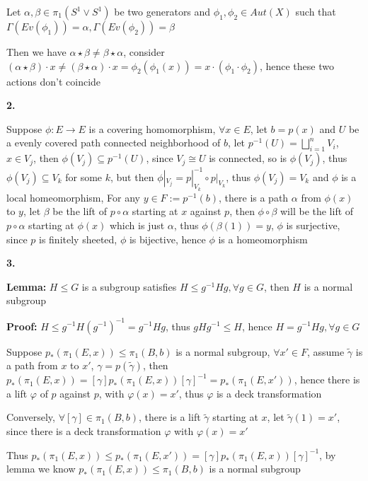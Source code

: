 \documentclass[../main.tex]{subfiles}
\begin{document}
Let $\alpha,\beta\in\pi_1(S^1\vee S^1)$ be two generators and $\phi_1,\phi_2\in Aut(X)$ such that $\Gamma(Ev(\phi_1))=\alpha, \Gamma(Ev(\phi_2))=\beta$ \par
Then we have $\alpha\star\beta\neq\beta\star\alpha$, consider $(\alpha\star\beta)\cdot x\neq (\beta\star\alpha)\cdot x=\phi_2(\phi_1(x))=x\cdot(\phi_1\cdot\phi_2)$, hence these two actions don't coincide \par
\textbf{2.} \par
Suppose $\phi: E\rightarrow E$ is a covering homomorphism, $\forall x\in E$, let $b=p(x)$ and $U$ be a evenly covered path connected neighborhood of $b$, let $p^{-1}(U)=\displaystyle\bigsqcup_{i=1}^nV_i$, $x\in V_j$, then $\phi(V_j)\subseteq p^{-1}(U)$, since $V_j\cong U$ is connected, so is $\phi(V_j)$, thus $\phi(V_j)\subseteq V_k$ for some $k$, but then $\phi|_{V_j}=p|_{V_k}^{-1}\circ p|_{V_k}$, thus $\phi(V_j)=V_k$ and $\phi$ is a local homeomorphism, For any $y\in F:=p^{-1}({b})$, there is a path $\alpha$ from $\phi(x)$ to $y$, let $\beta$ be the lift of $p\circ\alpha$ starting at $x$ against $p$, then $\phi\circ\beta$ will be the lift of $p\circ\alpha$ starting at $\phi(x)$ which is just $\alpha$, thus $\phi(\beta(1))=y$, $\phi$ is surjective, since $p$ is finitely sheeted, $\phi$ is bijective, hence $\phi$ is a homeomorphism \par
\textbf{3.} \par
\textbf{Lemma:} $H\leq G$ is a subgroup satisfies $H\leq g^{-1}Hg, \forall g\in G$, then $H$ is a normal subgroup \par
\textbf{Proof:} $H\leq g^{-1}H(g^{-1})^{-1}=g^{-1}Hg$, thus $gHg^{-1}\leq H$, hence $H=g^{-1}Hg, \forall g\in G$ \par
Suppose $p_*(\pi_1(E,x))\leq\pi_1(B,b)$ is a normal subgroup, $\forall x'\in F$, assume $\widetilde{\gamma}$ is a path from $x$ to $x'$, $\gamma=p(\widetilde{\gamma})$, then $p_*(\pi_1(E,x))=[\gamma]p_*(\pi_1(E,x))[\gamma]^{-1}=p_*(\pi_1(E,x'))$, hence there is a lift $\varphi$ of $p$ against $p$, with $\varphi(x)=x'$, thus $\varphi$ is a deck transformation \par
Conversely, $\forall [\gamma]\in\pi_1(B,b)$, there is a lift $\widetilde{\gamma}$ starting at $x$, let $\widetilde{\gamma}(1)=x'$, since there is a deck transformation $\varphi$ with $\varphi(x)=x'$ \par
Thus $p_*(\pi_1(E,x))\leq p_*(\pi_1(E,x'))=[\gamma]p_*(\pi_1(E,x))[\gamma]^{-1}$, by lemma we know $p_*(\pi_1(E,x))\leq\pi_1(B,b)$ is a normal subgroup
\end{document}
